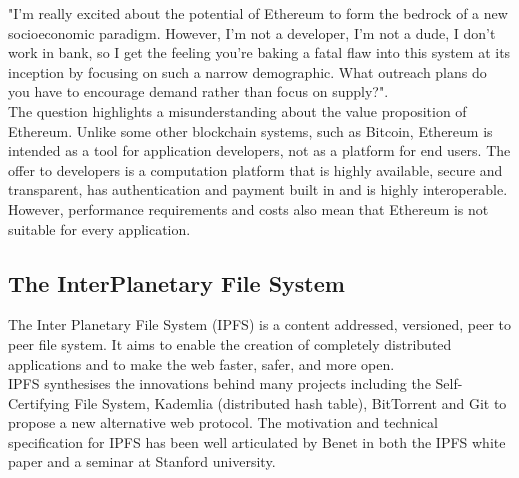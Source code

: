 "I'm really excited about the potential of Ethereum to form the bedrock of a new socioeconomic paradigm. However, I'm not a developer, I'm not a dude, I don't work in bank, so I get the feeling you're baking a fatal flaw into this system at its inception by focusing on such a narrow demographic. What outreach plans do you have to encourage demand rather than focus on supply?".\\

The question highlights a misunderstanding about the value proposition of Ethereum. Unlike some other blockchain systems, such as Bitcoin, Ethereum is intended as a tool for application developers, not as a platform for end users. The offer to developers is a computation platform that is highly available, secure and transparent, has authentication and payment built in and is highly interoperable. However, performance requirements and costs also mean that Ethereum is not suitable for every application. 

\subsection{The InterPlanetary File System}
\label{subsec:ipfs}
The Inter Planetary File System (IPFS) is a content addressed, versioned, peer to peer file system. It aims to enable the creation of completely distributed applications and to make the web faster, safer, and more open.\\

IPFS synthesises the innovations behind many projects including the Self-Certifying File System\cite{mazieres1998escaping}, Kademlia\cite{maymounkov2002kademlia} (distributed hash table), BitTorrent and Git to propose a new alternative web protocol. The motivation and technical specification for IPFS has been well articulated by Benet in both the IPFS white paper\cite{benet2014ipfs} and a seminar at Stanford university\cite{IPFSVid}.

